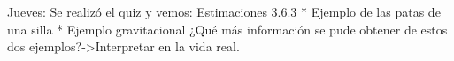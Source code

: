 Jueves: Se realizó el quiz y vemos:
Estimaciones 3.6.3
* Ejemplo de las patas de una silla
* Ejemplo gravitacional
¿Qué más información se pude obtener de estos dos ejemplos?->Interpretar en la vida real.

